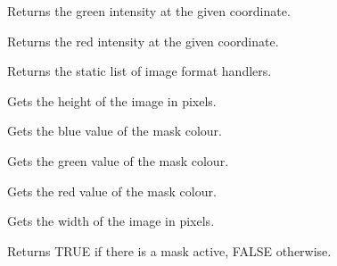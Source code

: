 
Returns the green intensity at the given coordinate.

\label{wximagegetred}


Returns the red intensity at the given coordinate.



Returns the static list of image format handlers.



\label{wximagegetheight}


Gets the height of the image in pixels.

\label{wximagegetmaskblue}


Gets the blue value of the mask colour.

\label{wximagegetmaskgreen}


Gets the green value of the mask colour.

\label{wximagegetmaskred}


Gets the red value of the mask colour.

\label{wximagegetwidth}


Gets the width of the image in pixels.



\label{wximagehasmask}


Returns TRUE if there is a mask active, FALSE otherwise.

